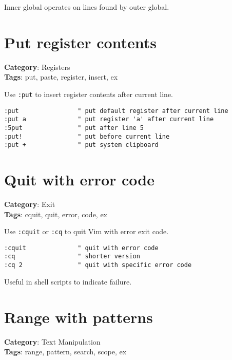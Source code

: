 {{{{{Inner global operates on lines found by outer global.

\section{Put register contents}

\textbf{Category}: Registers\\ \textbf{Tags}: put, paste, register, insert, ex
\vspace{0.5cm}

Use {\footnotesize \Verb§:put§} to insert register contents after current line.

\begin{Exa*}{}
\begin{Verbatim}[fontsize=\footnotesize, breaklines, breakanywhere]
:put                " put default register after current line
:put a              " put register 'a' after current line
:5put               " put after line 5
:put!               " put before current line
:put +              " put system clipboard
\end{Verbatim}
\end{Exa*}

\section{Quit with error code}

\textbf{Category}: Exit\\ \textbf{Tags}: cquit, quit, error, code, ex
\vspace{0.5cm}

Use {\footnotesize \Verb§:cquit§} or {\footnotesize \Verb§:cq§} to quit Vim with error exit code.

\begin{Exa*}{}
\begin{Verbatim}[fontsize=\footnotesize, breaklines, breakanywhere]
:cquit              " quit with error code
:cq                 " shorter version  
:cq 2               " quit with specific error code
\end{Verbatim}
\end{Exa*}

Useful in shell scripts to indicate failure.

\section{Range with patterns}

\textbf{Category}: Text Manipulation\\ \textbf{Tags}: range, pattern, search, scope, ex
\vspace{0.5cm}

}}}}}
